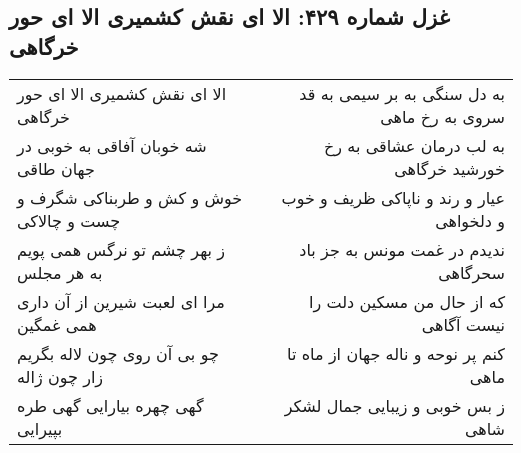 \begin{center}
\section*{غزل شماره ۴۲۹: الا ای نقش کشمیری الا ای حور خرگاهی}
\label{sec:429}
\begin{longtable}{l p{0.5cm} r}
الا ای نقش کشمیری الا ای حور خرگاهی
&&
به دل سنگی به بر سیمی به قد سروی به رخ ماهی
\\
شه خوبان آفاقی به خوبی در جهان طاقی
&&
به لب درمان عشاقی به رخ خورشید خرگاهی
\\
خوش و کش و طربناکی شگرف و چست و چالاکی
&&
عیار و رند و ناپاکی ظریف و خوب و دلخواهی
\\
ز بهر چشم تو نرگس همی پویم به هر مجلس
&&
ندیدم در غمت مونس به جز باد سحرگاهی
\\
مرا ای لعبت شیرین از آن داری همی غمگین
&&
که از حال من مسکین دلت را نیست آگاهی
\\
چو بی آن روی چون لاله بگریم زار چون ژاله
&&
کنم پر نوحه و ناله جهان از ماه تا ماهی
\\
گهی چهره بیارایی گهی طره بپیرایی
&&
ز بس خوبی و زیبایی جمال لشکر شاهی
\\
\end{longtable}
\end{center}
